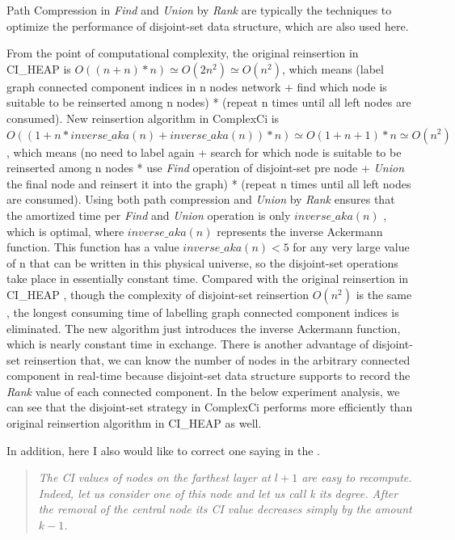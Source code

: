 \documentclass{article}
\newenvironment{itquote}
{\begin{quote}\itshape}
	{\end{quote}\ignorespacesafterend}
\begin{document}
\begin{enumerate}
\begin{item}
		Path Compression in \textit{Find} and \textit{Union} by \textit{Rank} are typically the techniques to optimize the performance of disjoint-set data structure\cite{wikiDisjointsetdatastructure}, which are also used here.
		 
		From the point of computational complexity, the original reinsertion in CI\_HEAP is $O((n+n)*n) \simeq O(2n^2) \simeq O(n^2)$, which means (label graph connected component indices in n nodes network + find which node is suitable to be reinserted among n nodes) * (repeat n times until all left nodes are consumed). New reinsertion algorithm in ComplexCi is $O((1+n*inverse\_aka(n)+inverse\_aka(n)) *n) \simeq O(1+n+1)*n \simeq O(n^2)$ , which means (no need to label again + search for which node is suitable to be reinserted among n nodes * use \textit{Find} operation of disjoint-set pre node + \textit{Union} the final node and reinsert it into the graph) * (repeat n times until all left nodes are consumed). Using both path compression and \textit{Union} by \textit{Rank} ensures that the amortized time per \textit{Find} and \textit{Union} operation is only $inverse\_aka(n)$ \cite{tarjan1979class}\cite{tarjan1984worst} , which is optimal, where $inverse\_aka(n)$ represents the inverse Ackermann function. This function has a value $inverse\_aka(n)<5$ for any very large value of n that can be written in this physical universe, so the disjoint-set operations take place in essentially constant time\cite{wikiDisjointsetdatastructure}. Compared with the original reinsertion in CI\_HEAP , though the complexity of disjoint-set reinsertion $O(n^2)$ is the same , the longest consuming time of labelling graph connected component indices is eliminated. The new algorithm just introduces the inverse Ackermann function, which is nearly constant time in exchange. There is another advantage of disjoint-set reinsertion that, we can know the number of nodes in the arbitrary connected component in real-time because disjoint-set data structure supports to record the \textit{Rank} value of each connected component. In the below experiment analysis, we can see that the disjoint-set strategy in ComplexCi performs more efficiently than original reinsertion algorithm in CI\_HEAP as well.


	\end{item}
	\end{enumerate}	

	
	In addition, here I also would like to correct one saying in the \cite{morone2016collective}. 
	
	\begin{itquote}
		The CI values of nodes on the farthest layer at $l + 1$ are easy to recompute. Indeed, let us consider one of this node and let us call k its degree. After the removal of the central node its CI value decreases simply by the amount $k − 1$.
	\end{itquote}
\end{document}
